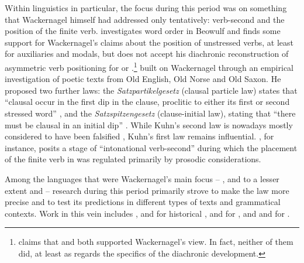 \documentclass[output=paper]{../langscibook}
\begin{document}
Within  linguistics in particular, the focus during this period was on something that Wackernagel himself had addressed only tentatively: verb-second and the position of the finite verb. \citet[315--318]{Ries1907} investigates word order in Beowulf and finds some support for Wackernagel's claims about the position of unstressed verbs, at least for auxiliaries and modals, but does not accept his diachronic reconstruction of asymmetric verb positioning for  or .\footnote{\citet[15--16]{Hopper1975} claims that \citet{Ries1907} and \citet{Delbrueck1907} both supported Wackernagel's view. In fact, neither of them did, at least as regards the specifics of the diachronic development.} \citet{Kuhn1933} built on Wackernagel through an empirical investigation of poetic texts from Old English, Old Norse and Old Saxon. He proposed two further laws: the  \emph{Satzpartikelgesetz} (clausal particle law) states that ``clausal  occur in the first dip in the clause, proclitic to either its first or second stressed word'' \citep[8]{Kuhn1933}, and the  \emph{Satzspitzengesetz} (clause-initial law), stating that ``there must be clausal  in an initial dip'' \citep[43]{Kuhn1933}. While Kuhn's second law is nowadays mostly considered to have been falsified \citep{Momma1997,Mines2002}, Kuhn's first law remains influential. \citet{Dewey2006}, for instance, posits a stage of ``intonational verb-second'' during which the placement of the finite verb in  was regulated primarily by prosodic considerations.

Among the languages that were Wackernagel's main focus -- , and to a lesser extent  and  -- research during this period primarily strove to make the law more precise and to test its predictions in different types of texts and grammatical contexts. Work in this vein includes \citet{Dover1960}, \citet{Marshall1987} and \citet{Ruijgh1990} for historical , \citet{Marouzeau1907,Marouzeau1953} and \citet{Fraenkel1932,Fraenkel1933,Fraenkel1965} for , and \citet{Hale1987PhD,Hale1987wackernagel} and \citet{Krisch1990} for .
\end{document}
